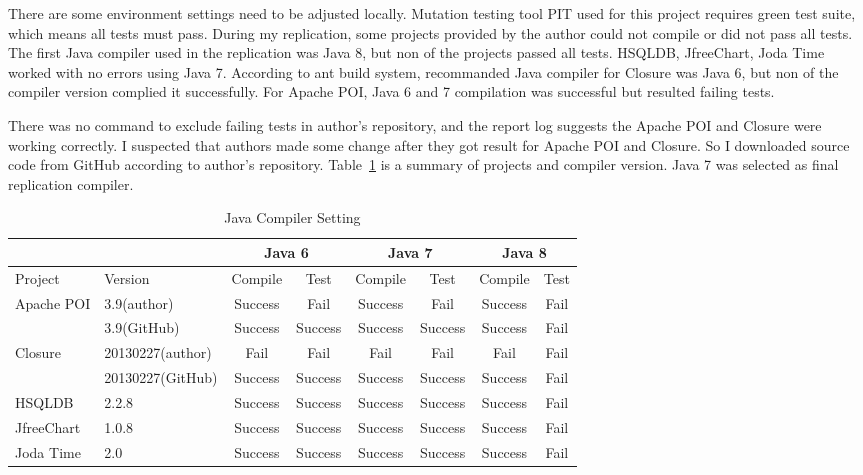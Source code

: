 There are some environment settings need to be adjusted locally. Mutation testing tool PIT used for this project requires green test suite, which means all tests must pass. During my replication, some projects provided by the author could not compile or did not pass all tests. The first Java compiler used in the replication was Java 8, but non of the projects passed all tests. HSQLDB, JfreeChart, Joda Time worked with no errors using Java 7. According to ant build system, recommanded Java compiler for Closure was Java 6, but non of the compiler version complied it successfully. For Apache POI, Java 6 and 7 compilation was successful but resulted failing tests.

There was no command to exclude failing tests in author's repository, and the report log suggests the Apache POI and Closure were working correctly. I suspected that authors made some change after they got result for Apache POI and Closure. So I downloaded source code from GitHub according to author's repository. Table~\ref{tab:sut} is a summary of projects and compiler version. Java 7 was selected as final replication compiler.


\begin{table}[h]
	\caption{Java Compiler Setting}
	\label{tab:sut}
	\begin{minipage}{\columnwidth}
		\begin{center}
			\begin{tabular}{|l|l|c|c|c|c|c|c|}
				\hline
				&&\multicolumn{2}{|c|}{Java 6}&\multicolumn{2}{|c|}{Java 7}&\multicolumn{2}{|c|}{Java 8}\\
				\hline
				Project & Version & Compile & Test & Compile & Test & Compile & Test \\
				\hline
				Apache POI & 3.9(author) & Success & Fail & Success & Fail & Success & Fail \\
				& 3.9(GitHub) & Success & Success& Success& Success & Success& Fail \\
				\hline
				Closure& 20130227(author) & Fail & Fail & Fail & Fail & Fail & Fail \\
				&20130227(GitHub) & Success & Success & Success & Success & Success & Fail \\
				\hline
				HSQLDB & 2.2.8 & Success & Success & Success & Success & Success & Fail \\
				\hline
				JfreeChart & 1.0.8 & Success & Success & Success & Success & Success & Fail \\
				\hline
				Joda Time & 2.0 & Success & Success & Success & Success & Success & Fail \\
				\hline
			\end{tabular}
		\end{center}
		\bigskip
	\end{minipage}
\end{table}

